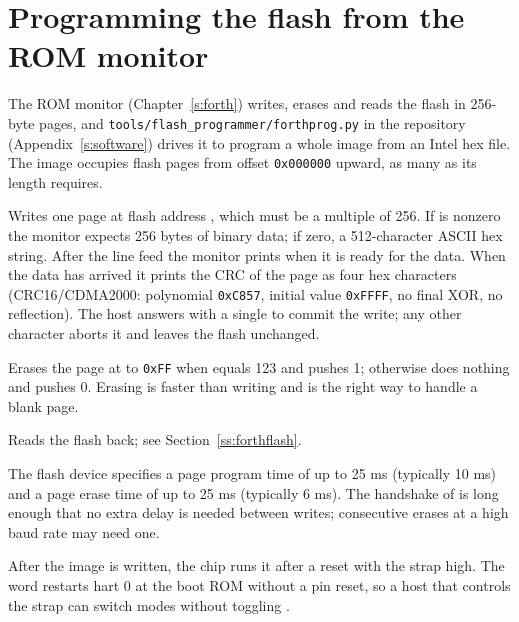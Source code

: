 \documentclass[11pt,pdftex,openany,letterpaper]{report}
\begin{document}
\section{Programming the flash from the ROM monitor} \label{ss:flashprog}

The ROM monitor (Chapter~\ref{s:forth}) writes, erases and reads the flash in 256-byte pages, and \texttt{tools/flash\_programmer/forthprog.py} in the repository (Appendix~\ref{s:software}) drives it to program a whole image from an Intel hex file. The image occupies flash pages from offset \texttt{0x000000} upward, as many as its length requires.

\begin{description}[style=nextline, leftmargin=0pt, itemsep=2pt]
	\item[\texttt{bin addr fw}] Writes one page at flash address , which must be a multiple of 256. If  is nonzero the monitor expects 256 bytes of binary data; if zero, a 512-character ASCII hex string. After the line feed the monitor prints \forthinline{\$} when it is ready for the data. When the data has arrived it prints the CRC of the page as four hex characters (CRC16/CDMA2000: polynomial \texttt{0xC857}, initial value \texttt{0xFFFF}, no final XOR, no reflection). The host answers with a single  to commit the write; any other character aborts it and leaves the flash unchanged.
	\item[\texttt{conf addr fe}] Erases the page at  to \texttt{0xFF} when  equals 123 and pushes 1; otherwise does nothing and pushes 0. Erasing is faster than writing and is the right way to handle a blank page.
	\item[\texttt{fr}] Reads the flash back; see Section~\ref{ss:forthflash}.
\end{description}

\begin{Note}
The flash device specifies a page program time of up to 25 ms (typically 10 ms) and a page erase time of up to 25 ms (typically 6 ms). The handshake of  is long enough that no extra delay is needed between writes; consecutive erases at a high baud rate may need one.
\end{Note}

After the image is written, the chip runs it after a reset with the  strap high. The  word restarts hart 0 at the boot ROM without a pin reset, so a host that controls the strap can switch modes without toggling .
\end{document}
